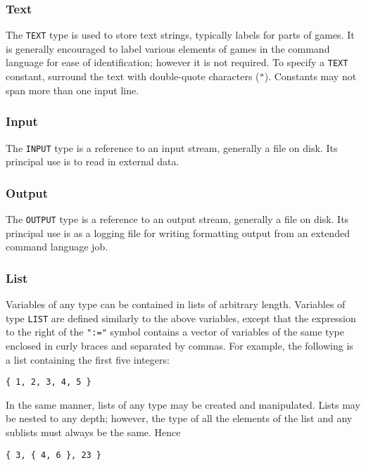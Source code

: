 \subsubsection{Text}

The {\tt TEXT} type is used to store text strings, typically labels
for parts of games.  It is generally encouraged to label various elements
of games in the command language for ease of identification; however it
is not required.  To specify a {\tt TEXT} constant, surround the
text with double-quote characters ({\tt "}).  Constants may not span
more than one input line.

\subsubsection{Input}

The {\tt INPUT} type is a reference to an input stream, generally a file
on disk.  Its principal use is to read in external data. 

\subsubsection{Output}

The {\tt OUTPUT} type is a reference to an output stream, generally a
file on disk.  Its principal use is as a logging file for writing
formatting output from an extended command language job.  

\subsubsection{List}

Variables of any type can be contained in lists of arbitrary length.
Variables of type {\tt LIST} are defined similarly to the above
variables, except that the expression to the right of the {\tt ":="}
symbol contains a vector of variables of the same type enclosed in
curly braces and separated by commas.  For example, the following is a
list containing the first five integers:

\begin{verbatim}
{ 1, 2, 3, 4, 5 }
\end{verbatim}

\noindent In the same manner, lists of any type may be created and
manipulated.  Lists may be nested to any depth; however, the type of
all the elements of the list and any sublists must always be the same.
Hence

\begin{verbatim}
{ 3, { 4, 6 }, 23 }
\end{verbatim}

